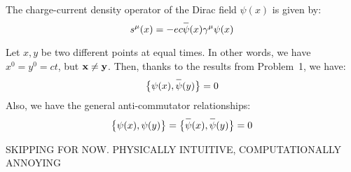\documentclass[letterpaper,12pt]{article}
\newenvironment{problem}{\subsection{}\begin{adjustwidth}{0.25in}{}\vspace{-\baselineskip}}{\end{adjustwidth}}
\newcommand{\overbar}[1]{
	\mkern 1.5mu \overline{\mkern-1.5mu\raisebox{0pt}[\dimexpr\height+0.5mm\relax]{$#1$}\mkern-1.5mu}\mkern 1.5mu
}
\begin{document}
\begin{problem}
The charge-current density operator of the Dirac field $\psi(x)$ is given by:
\begin{equation*}
	s^\mu (x) = -ec \overbar{\psi}(x) \gamma^\mu \psi(x)
\end{equation*}

Let $x,y$ be two different points at equal times. In other words, we have $x^0=y^0=ct$, but $\vb{x} \neq \vb{y}$. Then, thanks to the results from Problem~1, we have:
\begin{equation*}
	\big\{\psi(x), \overbar{\psi}(y)\big\} = 0
\end{equation*}
Also, we have the general anti-commutator relationships:
\begin{equation*}
	\big\{\psi(x), \psi(y)\big\} = \big\{\overbar{\psi}(x), \overbar{\psi}(y)\big\} = 0
\end{equation*}

\Large{SKIPPING FOR NOW. PHYSICALLY INTUITIVE, COMPUTATIONALLY ANNOYING}


\end{problem}
\end{document}
